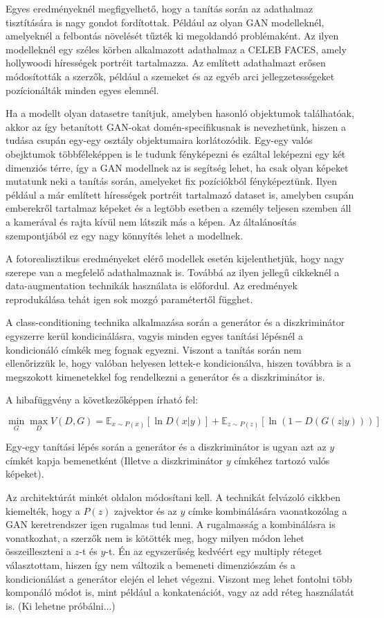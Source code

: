 Egyes eredményeknél megfigyelhető, hogy a tanítás során az adathalmaz tisztítására is nagy gondot fordítottak. Például az olyan GAN modelleknél, amelyeknél a felbontás növelését tűzték ki megoldandó problémaként. Az ilyen modelleknél egy széles körben alkalmazott adathalmaz a CELEB FACES, amely hollywoodi hírességek portréit tartalmazza. Az említett adathalmazt erősen módosították a szerzők, például a szemeket és az egyéb arci jellegzetességeket pozícionálták minden egyes elemnél.

Ha a modellt olyan datasetre tanítjuk, amelyben hasonló objektumok találhatóak, akkor az így betanított GAN-okat domén-specifikusnak is nevezhetünk, hiszen a tudása csupán egy-egy osztály objektumaira korlátozódik. Egy-egy valós obejktumok többféleképpen is le tudunk fényképezni és ezáltal leképezni egy két dimenziós térre, így a GAN modellnek az is segítség lehet, ha csak olyan képeket mutatunk neki a tanítás során, amelyeket fix pozíciókból fényképeztünk.
Ilyen például a már említett hírességek portréit tartalmazó dataset is, amelyben csupán emberekről tartalmaz képeket és a legtöbb esetben a személy teljesen szemben áll a kamerával és rajta kívül nem látszik más a képen. Az általánosítás szempontjából ez egy nagy könnyítés lehet a modellnek.

A fotorealisztikus eredményeket elérő modellek esetén kijelenthetjük, hogy nagy szerepe van a megfelelő adathalmaznak is. Továbbá az ilyen jellegű cikkeknél a data-augmentation technikák használata is előfordul. Az eredmények reprodukálása tehát igen sok mozgó paramétertől függhet.

A class-conditioning technika alkalmazása során a generátor és a diszkriminátor egyszerre kerül kondicinálásra, vagyis minden egyes tanítási lépésnél a kondicionáló címkék meg fognak egyezni. Viszont a tanítás során nem ellenőrizzük le, hogy valóban helyesen lettek-e kondicionálva, hiszen továbbra is a megszokott kimenetekkel fog rendelkezni a generátor és a diszkriminátor is.

A hibafüggvény a következőképpen írható fel:

$$\min_{G}\max_{D}V(D, G) =  \mathbb{E}_{x \sim P(x)} \left[\ln D(x|y) \right] + \mathbb{E}_{z \sim P(z)} \left[\ln(1 - D(G(z|y))) \right]$$

Egy-egy tanítási lépés során a generátor és a diszkriminátor is ugyan azt az $y$ címkét kapja bemenetként (Illetve a diszkriminátor $y$ címkéhez tartozó valós képeket).

Az architektúrát minkét oldalon módosítani kell. A technikát felvázoló cikkben \cite{mirza2014conditional} kiemelték, hogy a $P(z)$ zajvektor és az $y$ címke kombinálására vaonatkozólag a GAN keretrendszer igen rugalmas tud lenni. A rugalmasság a kombinálásra is vonatkozhat, a szerzők nem is kötötték meg, hogy milyen módon lehet összeilleszteni a $z$-t és $y$-t. Én az egyszerűség kedvéért egy multiply réteget választottam, hiszen így nem változik a bemeneti dimenziószám és a kondicionálást a generátor elején el lehet végezni. Viszont meg lehet fontolni több komponáló módot is, mint például a konkatenációt, vagy az add réteg használatát is. (Ki lehetne próbálni...)

